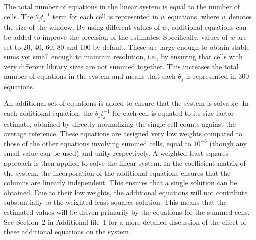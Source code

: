\documentclass{bmcart}
\newcommand{\supplineardep}{2}
\newcommand{\revised}[1]{#1}
\begin{document}
The total number of equations in the linear system is equal to the number of cells.
The $\theta_jt_j^{-1}$ term for each cell is represented in $w$ equations, where $w$ denotes the size of the window.
By using different values of $w$, additional equations can be added to improve the precision of the estimates. 
Specifically, values of $w$ are set to 20, 40, 60, 80 and 100 by default.
These are large enough to obtain stable sums yet small enough to maintain resolution, i.e., by ensuring that cells with very different library sizes are not summed together.
This increases the total number of equations in the system and means that each $\theta_j$ is represented in 300 equations. 


An additional set of equations is added to ensure that the system is solvable.
In each \revised{additional} equation, the $\theta_jt_j^{-1}$ for each cell is equated to its size factor estimate, obtained by directly normalizing the single-cell counts against the average reference.
These equations are assigned very low weights compared to those of the other equations involving summed cells, equal to $10^{-6}$ (though any small value can be used) and unity respectively.
A weighted least-squares approach is then applied to solve the linear system.
In the \revised{coefficient matrix} of the system, the incorporation of the additional equations ensures that the columns are linearly independent.
This ensures that a single solution can be obtained.
Due to their low weights, the additional equations will not contribute substantially to the weighted least-squares solution.
This means that the estimated values will be driven primarily by the equations for the summed cells.
See Section~\supplineardep{} in Additional file~1 for a more detailed discussion of the effect of these additional equations on the system.

\end{document}
